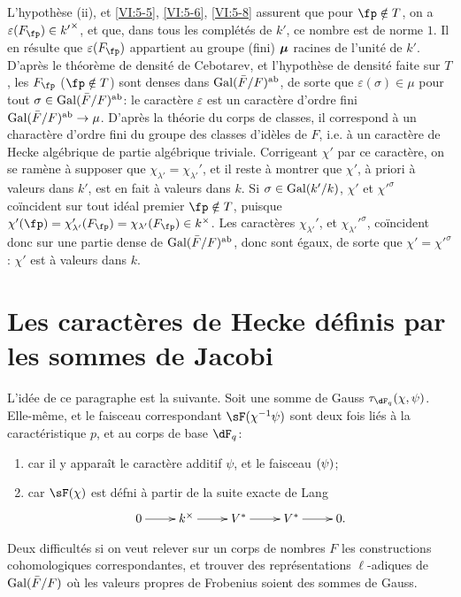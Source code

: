 L'hypoth\`ese (ii), et \ref{VI:5-5}, \ref{VI:5-6}, \ref{VI:5-8} assurent que 
pour $\fp\notin T$, on a $\varepsilon(F_\fp)\in {k'}^\times$, et que, dans tous 
les compl\'et\'es de $k'$, ce nombre est de norme $1$. Il en r\'esulte que 
$\varepsilon(F_\fp)$ appartient au groupe (fini) ${\bm\mu}$ racines de l'unit\'e 
de $k'$. D'apr\`es le th\'eor\`eme de densit\'e de Cebotarev, et l'hypoth\`ese 
de densit\'e faite sur $T$, les $F_\fp$ ($\fp\notin T$) sont denses dans 
$\operatorname{Gal}(\bar F/F)^\text{ab}$, de sorte que $\varepsilon(\sigma)\in \mu$ pour tout 
$\sigma\in \operatorname{Gal}(\bar F/F)^\text{ab}$: le caract\`ere $\varepsilon$ est un 
caract\`ere d'ordre fini $\operatorname{Gal}(\bar F/F)^\text{ab}\to \mu$. D'apr\`es la 
th\'eorie du corps de classes, il correspond \`a un charact\`ere d'ordre fini 
du groupe des classes d'id\`eles de $F$, i.e. \`a un caract\`ere de Hecke 
alg\'ebrique de partie alg\'ebrique triviale. Corrigeant $\chi'$ par ce 
caract\`ere, on se ram\`ene \`a supposer que 
$\chi_{\lambda'}=\chi_{\lambda'}'$,  et il reste \`a montrer que $\chi'$, \`a 
priori \`a valeurs dans $k'$, est en fait \`a valeurs dans $k$. Si 
$\sigma\in \operatorname{Gal}(k'/k)$, $\chi'$ et ${\chi'}^\sigma$ coïncident sur tout id\'eal 
premier $\fp\notin T$, puisque 
$\chi'(\fp) = \chi'_{\lambda'}(F_\fp) = \chi_{\lambda'}(F_\fp) \in k^\times$. 
Les caract\`eres $\chi_{\lambda'}'$, et ${\chi_{\lambda'}'}^\sigma$, coïncident 
donc sur une partie dense de $\operatorname{Gal}(\bar F/F)^\text{ab}$, donc sont \'egaux, de 
sorte que $\chi'={\chi'}^\sigma$: $\chi'$ est \`a valeurs dans $k$. 










\section{Les caract\`eres de Hecke d\'efinis par les sommes de Jacobi}\label{VI:6}

L'id\'ee de ce paragraphe est la suivante. Soit une somme de Gauss 
$\tau_{\dF_q}(\chi,\psi)$. Elle-m\^eme, et le faisceau correspondant 
$\sF(\chi^{-1}\psi)$ sont deux fois li\'es \`a la caract\'eristique $p$, et au 
corps de base $\dF_q$: 
\begin{enumerate}[\indent a)]
  \item car il y appara\^it le caract\`ere additif $\psi$, et le faisceau 
    $\sf(\psi)$; 
  \item car $\sF(\chi)$ est d\'efni \`a partir de la suite exacte de Lang 
    \[\xymatrix{
      0 \ar[r] 
        & k^\times \ar[r] 
        & V^\ast \ar[r] 
        & V^\ast \ar[r] 
        & 0 \text{.} 
    }\]
\end{enumerate}
Deux difficult\'es si on veut relever sur un corps de nombres $F$ les 
constructions cohomologiques correspondantes, et trouver des 
repr\'esentations $\ell$-adiques de $\operatorname{Gal}(\bar F/F)$ o\`u les valeurs propres 
de Frobenius soient des sommes de Gauss. 

